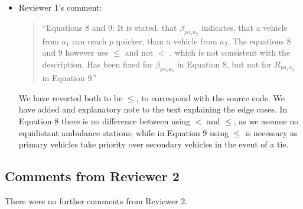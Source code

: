 \documentclass{article}
\begin{document}
\begin{itemize}
  \item Reviewer 1's comment:
    \begin{quote}
    ``Equations 8 and 9: It is stated, that \(\beta_{pa_1a_2}\) indicates, that a vehicle from \(a_1\) can reach \(p\) quicker, than a vehicle from \(a_2\). The equations 8 and 9 however use \(\leq\) and not \(<\) , which is not consistent with the description. Has been fixed for \(\beta_{pa_1a_2}\) in Equation 8, but not for \(R_{pa_1a_2}\) in Equation 9.''
    \end{quote}
    
    We have reverted both to be $\leq$, to correspond with the source code. We have added and explanatory note to the text explaining the edge cases. In Equation 8 there is no difference between using $<$ and $\leq$, as we assume no equidistant ambulance stations; while in Equation 9 using $\leq$ is necessary as primary vehicles take priority over secondary vehicles in the event of a tie.

\end{itemize}

\subsection{Comments from Reviewer 2}

There were no further comments from Reviewer 2.
\end{document}
